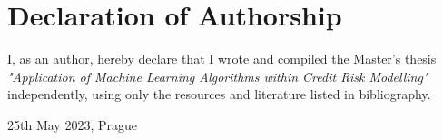 \vfill

\vglue 14cm

\section*{Declaration of Authorship}
I, as an author, hereby declare that I wrote and compiled the Master's thesis {\it{"Application of Machine Learning Algorithms within Credit Risk Modelling"}} independently, using only the resources and literature listed in bibliography.

\bigskip 

\vspace{0.5cm}


\begin{flushleft}
25th May 2023, Prague 
\end{flushleft}
\vspace{-0.5cm}
\begin{flushright}
\AuthorDP
\end{flushright}

